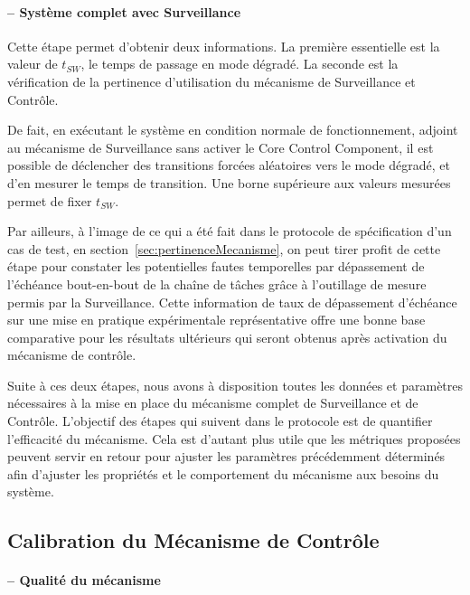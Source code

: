 \documentclass[french, a4paper, 11pt, twoside, pdftex]{StyleThese}
\begin{document}
                    
            \paragraph{ -- Système complet avec Surveillance}
            
            Cette étape permet d'obtenir deux informations. La première essentielle est la valeur de $t_{SW}$, le temps de passage en mode dégradé. La seconde est la vérification de la pertinence d'utilisation du mécanisme de Surveillance et Contrôle. 
            
            De fait, en exécutant le système en condition normale de fonctionnement, adjoint au mécanisme de Surveillance sans activer le Core Control Component, il est possible de déclencher des transitions forcées aléatoires vers le mode dégradé, et d'en mesurer le temps de transition. Une borne supérieure aux valeurs mesurées permet de fixer $t_{SW}$.
            
            Par ailleurs, à l'image de ce qui a été fait dans le protocole de spécification d'un cas de test, en section~\ref{sec:pertinenceMecanisme}, on peut tirer profit de cette étape pour constater les potentielles fautes temporelles par dépassement de l'échéance bout-en-bout de la chaîne de tâches grâce à l'outillage de mesure permis par la Surveillance. Cette information de taux de dépassement d'échéance sur une mise en pratique expérimentale représentative offre une bonne base comparative pour les résultats ultérieurs qui seront obtenus après activation du mécanisme de contrôle.
            
            \smallbreak
            Suite à ces deux étapes, nous avons à disposition toutes les données et paramètres nécessaires à la mise en place du mécanisme complet de Surveillance et de Contrôle.
            L'objectif des étapes qui suivent dans le protocole est de quantifier l'efficacité du mécanisme. Cela est d'autant plus utile que les métriques proposées peuvent servir en retour pour ajuster les paramètres précédemment déterminés afin d'ajuster les propriétés et le comportement du mécanisme aux besoins du système. 
            
    \subsection{Calibration du Mécanisme de Contrôle}
    
    	\paragraph{ -- Qualité du mécanisme}
\end{document}
